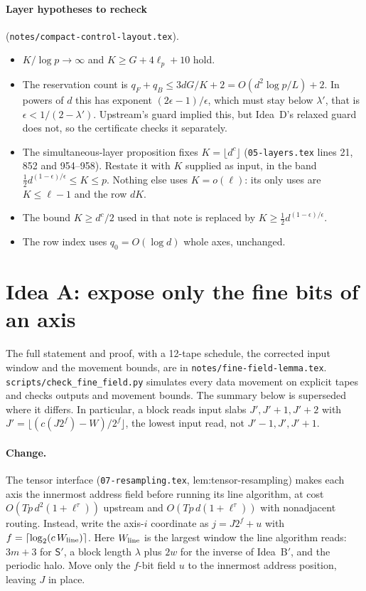 \documentclass[11pt]{article}
\theoremstyle{remark}\newtheorem*{remark}{Remark}
\begin{document}
\paragraph{Layer hypotheses to recheck} (\texttt{notes/compact-control-layout.tex}).
\begin{itemize}
\item $K/\log p\to\infty$ and $K\ge G+4\ell_p+10$ hold.
\item The reservation count is $q_F+q_B\le3dG/K+2=O(d^2\log p/L)+2$. In powers of $d$ this has
exponent $(2\epsilon-1)/\epsilon$, which must stay below $\lambda'$, that is $\epsilon<1/(2-\lambda')$. Upstream's guard implied this, but Idea~D's relaxed guard does not, so the certificate checks it separately.
\item The simultaneous-layer proposition fixes $K=\lfloor d^c\rfloor$ (\texttt{05-layers.tex} lines 21, 852 and 954--958). Restate it with $K$ supplied as input, in the band $\tfrac12d^{(1-\epsilon)/\epsilon}\le K\le p$. Nothing else uses $K=o(\ell)$: its only uses are $K\le\ell-1$ and the row $dK$.
\item The bound $K\ge d^c/2$ used in that note is replaced by $K\ge\tfrac12d^{(1-\epsilon)/\epsilon}$.
\item The row index uses $q_0=O(\log d)$ whole axes, unchanged.
\end{itemize}

\section{Idea A: expose only the fine bits of an axis}

The full statement and proof, with a 12-tape schedule, the corrected input window and the movement bounds, are in \texttt{notes/fine-field-lemma.tex}. \texttt{scripts/check\_fine\_field.py} simulates every data movement on explicit tapes and checks outputs and movement bounds. The summary below is superseded where it differs. In particular, a block reads input slabs $J',J'+1,J'+2$ with $J'=\lfloor(c(J2^f)-W)/2^f\rfloor$, the lowest input read, not $J'-1,J',J'+1$.

\paragraph{Change.} The tensor interface (\texttt{07-resampling.tex}, lem:tensor-resampling)
makes each axis the innermost address field before running its line algorithm, at cost
$O(Tp\,d^2(1+\ell^\tau))$ upstream and $O(Tp\,d(1+\ell^\tau))$ with nonadjacent routing.
Instead, write the axis-$i$ coordinate as $j=J2^f+u$ with
$f=\lceil\log_2(c\,W_{\rm line})\rceil$. Here $W_{\rm line}$ is the largest window the line
algorithm reads: $3m+3$ for $\mathsf S'$, a block length $\lambda$ plus $2w$ for the inverse of
Idea~B$'$, and the periodic halo. Move only the $f$-bit field $u$ to the innermost address
position, leaving $J$ in place.
\end{document}
